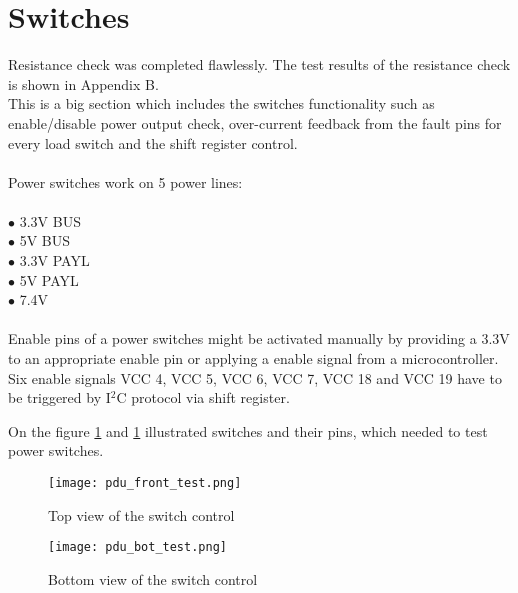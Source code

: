 \section{Switches}Resistance check was completed flawlessly. The test results of the resistance check is shown in Appendix B.\\
This is a big section which includes the switches functionality such as enable/disable power output check, over-current feedback from the fault pins for every load switch  and the shift register control. \\
\\
Power switches work on 5 power lines:\\ \\
$\bullet$ 3.3V BUS\\
$\bullet$ 5V BUS\\
$\bullet$ 3.3V PAYL\\
$\bullet$ 5V PAYL\\
$\bullet$ 7.4V\\ \\
Enable pins of a power switches might be activated manually by providing a 3.3V to an appropriate enable pin or applying a enable signal from a microcontroller.  Six enable signals VCC 4, VCC 5, VCC 6, VCC 7, VCC 18 and VCC 19 have to be triggered by I$^2$C protocol via shift register.

On the figure \ref{fig: pdu_test_front}  and \ref{fig: pdu_test_front} illustrated switches and their pins, which needed to test power switches.

\begin{figure}[h]
	\centering
	\texttt{[image: pdu\_front\_test.png]}
	\caption{Top view of the switch control}
	\label{fig: pdu_test_front}
\end{figure} 

\begin{figure}[h]
	\centering
	\texttt{[image: pdu\_bot\_test.png]}
	\caption{Bottom view of the switch control}
	\label{fig: pdu_test_back}
\end{figure}

